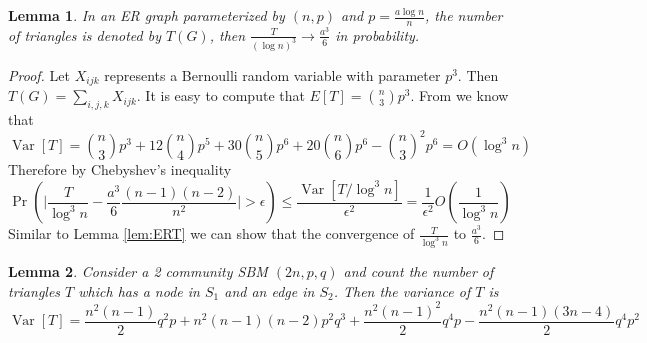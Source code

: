 \documentclass{ctexart}
\newtheorem{lemma}{Lemma}
\DeclareMathOperator{\Var}{Var}
\begin{document}
\begin{lemma}\label{lem:ER_tr_counting}
	In an ER graph parameterized by $(n,p)$ and $p=\frac{a\log n}{n}$, the number of triangles is denoted by $T(G)$, then
	$\frac{T}{(\log n)^3} \to \frac{a^3}{6}$ in probability.
\end{lemma}
\begin{proof}
	Let $X_{ijk}$ represents a Bernoulli random variable with parameter $p^3$.
	Then $T(G) = \sum_{i,j,k} X_{ijk}$.
	It is easy to compute that $E[T] = \binom{n}{3}p^3$.
	From \cite{holland1977method} we know that
	$$
	\Var[T] = \binom{n}{3} p^3 + 12 \binom{n}{4} p^5 + 30 \binom{n}{5} p^6 + 20 \binom{n}{6} p^6 - \binom{n}{3}^2 p^6 = O(\log^3 n)
	$$
	Therefore
	by Chebyshev's inequality
	$$
	\Pr(\Big|\frac{T}{\log^3 n } - \frac{a^3}{6} \frac{(n-1)(n-2)}{n^2}\Big| > \epsilon) \leq \frac{\Var[T /\log^3 n ]}{\epsilon^2} 
	= \frac{1}{\epsilon^2}O(\frac{1}{\log^3 n})
	$$
	Similar to Lemma \ref{lem:ERT} we can show that the convergence of $\frac{T}{\log^3 n}$ to $\frac{a^3}{6}$.
\end{proof}
\begin{lemma}\label{lem:SBM_tr_counting_cross}
	Consider a 2 community SBM $(2n, p, q)$ and count the number of triangles $T$ which has a node in $S_1$ and an edge in $S_2$.
	Then the variance of $T$ is
	\begin{equation}\label{eq:SBM_tr_counting_cross}
	\Var[T] = \frac{n^2(n-1)}{2}q^2p + n^2(n-1)(n-2)p^2q^3 +\frac{n^2(n-1)^2}{2}q^4p - \frac{n^2(n-1)(3n-4)}{2}q^4 p^2
	\end{equation}
\end{lemma}
\end{document}

